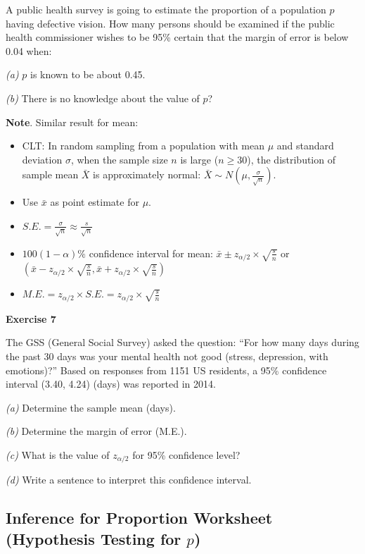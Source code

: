 \documentclass[
]{book}
\begin{document}
A public health survey is going to estimate the proportion of a population \(p\) having defective vision. How many persons should be examined if the public health commissioner wishes to be 95\% certain that the margin of error is below 0.04 when:

\emph{(a)} \(p\) is known to be about 0.45.

\emph{(b)} There is no knowledge about the value of \(p\)?

\textbf{Note}. Similar result for mean:

\begin{itemize}
\item
  CLT: In random sampling from a population with mean \(\mu\) and standard deviation \(\sigma\), when the sample size \(n\) is large (\(n \geq 30\)), the distribution of sample mean \(\bar{X}\) is approximately normal: \(\bar{X} \sim N(\mu, \frac{\sigma}{\sqrt{n}})\).
\item
  Use \(\bar{x}\) as point estimate for \(\mu\).
\item
  \(S.E. = \frac{\sigma}{\sqrt{n}} \approx \frac{s}{\sqrt{n}}\)
\item
  \(100(1-\alpha)\%\) confidence interval for mean: \(\bar{x} \pm z_{\alpha/2} \times \sqrt{\frac{s}{n}}\) or \((\bar{x} - z_{\alpha/2} \times \sqrt{\frac{s}{n}}, \bar{x} + z_{\alpha/2} \times \sqrt{\frac{s}{n}})\)
\item
  \(M.E. = z_{\alpha/2} \times S.E. = z_{\alpha/2} \times \sqrt{\frac{s}{n}}\)
\end{itemize}

\textbf{Exercise 7}

The GSS (General Social Survey) asked the question: ``For how many days during the past 30 days was your mental health not good (stress, depression, with emotions)?'' Based on responses from 1151 US residents, a 95\% confidence interval (3.40, 4.24) (days) was reported in 2014.

\emph{(a)} Determine the sample mean (days).

\emph{(b)} Determine the margin of error (M.E.).

\emph{(c)} What is the value of \(z_{\alpha/2}\) for 95\% confidence level?

\emph{(d)} Write a sentence to interpret this confidence interval.

\subsection{\texorpdfstring{Inference for Proportion Worksheet (Hypothesis Testing for \(p\))}{Inference for Proportion Worksheet (Hypothesis Testing for p)}}\label{inference-for-proportion-worksheet-hypothesis-testing-for-p}
\end{document}
